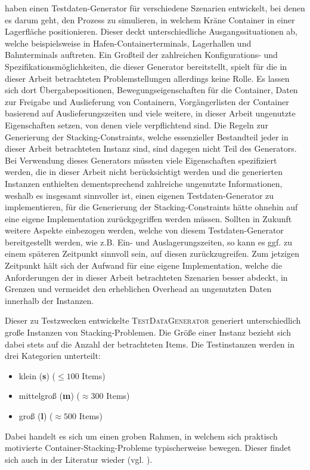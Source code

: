 \citet{Briskorn2018} haben einen Testdaten-Generator für verschiedene Szenarien entwickelt, bei denen
es darum geht, den Prozess zu simulieren, in welchem Kräne Container in einer Lagerfläche positionieren.
Dieser deckt unterschiedliche Ausgangssituationen ab, welche beispielsweise in Hafen-Containerterminals,
Lagerhallen und Bahnterminals auftreten.
Ein Großteil der zahlreichen Konfigurations- und Spezifikationsmöglichkeiten, die dieser
Generator bereitstellt, spielt für die in dieser Arbeit betrachteten Problemstellungen allerdings keine Rolle.
Es lassen sich dort Übergabepositionen, Bewegungseigenschaften für die Container, Daten zur Freigabe und Auslieferung von
Containern, Vorgängerlisten der Container basierend auf Auslieferungszeiten und viele weitere, in dieser Arbeit
ungenutzte Eigenschaften setzen, von denen viele verpflichtend sind. Die Regeln zur Generierung der Stacking-Constraints,
welche essenzieller Bestandteil jeder in dieser Arbeit betrachteten Instanz sind, sind dagegen nicht Teil des Generators.
Bei Verwendung dieses Generators müssten viele Eigenschaften spezifiziert werden, die in dieser Arbeit nicht
berücksichtigt werden und die generierten Instanzen enthielten dementsprechend zahlreiche ungenutzte Informationen,
weshalb es insgesamt sinnvoller ist, einen eigenen Testdaten-Generator zu implementieren, für die Generierung der
Stacking-Constraints hätte ohnehin auf eine eigene Implementation zurückgegriffen werden müssen.
Sollten in Zukunft weitere Aspekte einbezogen werden, welche von diesem Testdaten-Generator bereitgestellt
werden, wie z.B. Ein- und Auslagerungszeiten, so kann es ggf. zu einem späteren Zeitpunkt sinnvoll
sein, auf diesen zurückzugreifen. Zum jetzigen Zeitpunkt hält sich der Aufwand für eine eigene Implementation,
welche die Anforderungen der in dieser Arbeit betrachteten Szenarien besser abdeckt, in Grenzen und vermeidet den
erheblichen Overhead an ungenutzten Daten innerhalb der Instanzen.

Dieser zu Testzwecken entwickelte \textsc{TestDataGenerator} generiert unterschiedlich große Instanzen von Stacking-Problemen.
Die Größe einer Instanz bezieht sich dabei stets auf die Anzahl der betrachteten Items. Die Testinstanzen werden
in drei Kategorien unterteilt:
\begin{itemize}
  \item klein (\textbf{s}) ($\leq 100$ Items)
  \item mittelgroß (\textbf{m}) ($\approx 300$ Items)
  \item groß (\textbf{l}) ($\approx 500$ Items)\newline
  \vspace{-1\baselineskip}
\end{itemize}
Dabei handelt es sich um einen groben Rahmen, in welchem sich praktisch motivierte Container-Stacking-Probleme
typischerweise bewegen. Dieser findet sich auch in der Literatur wieder (vgl. \citet{Le2016}).

